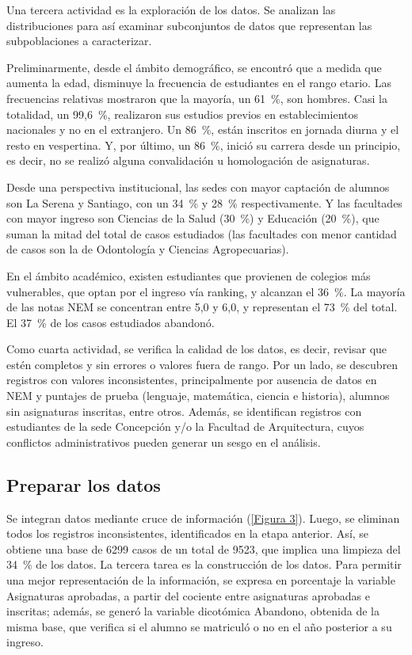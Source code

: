 \documentclass[portuguese]{textolivre}
\begin{document}
Una tercera actividad es la exploración de los datos. Se analizan las distribuciones para así examinar subconjuntos de datos que representan las subpoblaciones a caracterizar.

Preliminarmente, desde el ámbito demográfico, se encontró que a medida que aumenta la edad, disminuye la frecuencia de estudiantes en el rango etario. Las frecuencias relativas mostraron que la mayoría, un 61~\%, son hombres. Casi la totalidad, un 99,6~\%, realizaron sus estudios previos en establecimientos nacionales y no en el extranjero. Un 86~\%, están inscritos en jornada diurna y el resto en vespertina. Y, por último, un 86~\%, inició su carrera desde un principio, es decir, no se realizó alguna convalidación u homologación de asignaturas.

Desde una perspectiva institucional, las sedes con mayor captación de alumnos son La Serena y Santiago, con un 34~\% y 28~\% respectivamente. Y las facultades con mayor ingreso son Ciencias de la Salud (30~\%) y Educación (20~\%), que suman la mitad del total de casos estudiados (las facultades con menor cantidad de casos son la de Odontología y Ciencias Agropecuarias).

En el ámbito académico, existen estudiantes que provienen de colegios más vulnerables, que optan por el ingreso vía ranking, y alcanzan el 36~\%. La mayoría de las notas NEM se concentran entre 5,0 y 6,0, y representan el 73~\% del total. El 37~\% de los casos estudiados abandonó.

Como cuarta actividad, se verifica la calidad de los datos, es decir, revisar que estén completos y sin errores o valores fuera de rango. Por un lado, se descubren registros con valores inconsistentes, principalmente por ausencia de datos en NEM y puntajes de prueba (lenguaje, matemática, ciencia e historia), alumnos sin asignaturas inscritas, entre otros. Además, se identifican registros con estudiantes de la sede Concepción y/o la Facultad de Arquitectura, cuyos conflictos administrativos pueden generar un sesgo en el análisis.

\subsection{Preparar los datos}\label{sec-formato}

Se integran datos mediante cruce de información (\cref{Figura 3}). Luego, se eliminan todos los registros inconsistentes, identificados en la etapa anterior. Así, se obtiene una base de 6299 casos de un total de 9523, que implica una limpieza del 34~\% de los datos. La tercera tarea es la construcción de los datos. Para permitir una mejor representación de la información, se expresa en porcentaje la variable Asignaturas aprobadas, a partir del cociente entre asignaturas aprobadas e inscritas; además, se generó la variable dicotómica Abandono, obtenida de la misma base, que verifica si el alumno se matriculó o no en el año posterior a su ingreso.
\end{document}
